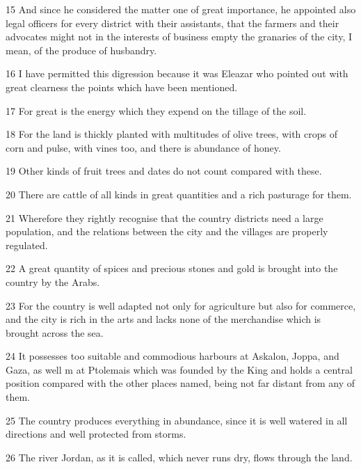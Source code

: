\par 15 And since he considered the matter one of great importance, he appointed also legal officers for every district with their assistants, that the farmers and their advocates might not in the interests of business empty the granaries of the city, I mean, of the produce of husbandry.

\par 16 I have permitted this digression because it was Eleazar who pointed out with great clearness the points which have been mentioned.

\par 17 For great is the energy which they expend on the tillage of the soil.

\par 18 For the land is thickly planted with multitudes of olive trees, with crops of corn and pulse, with vines too, and there is abundance of honey.

\par 19 Other kinds of fruit trees and dates do not count compared with these.

\par 20 There are cattle of all kinds in great quantities and a rich pasturage for them.

\par 21 Wherefore they rightly recognise that the country districts need a large population, and the relations between the city and the villages are properly regulated.

\par 22 A great quantity of spices and precious stones and gold is brought into the country by the Arabs.

\par 23 For the country is well adapted not only for agriculture but also for commerce, and the city is rich in the arts and lacks none of the merchandise which is brought across the sea.

\par 24 It possesses too suitable and commodious harbours at Askalon, Joppa, and Gaza, as well m at Ptolemais which was founded by the King and holds a central position compared with the other places named, being not far distant from any of them.

\par 25 The country produces everything in abundance, since it is well watered in all directions and well protected from storms.

\par 26 The river Jordan, as it is called, which never runs dry, flows through the land.

